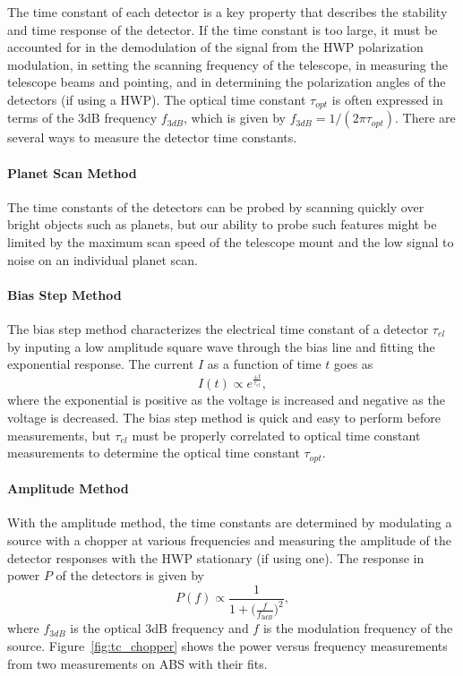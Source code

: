 The time constant of each detector is a key property that describes the stability and time response of the detector. If the time constant is too large, it must be accounted for in the demodulation of the signal from the HWP polarization modulation, in setting the scanning frequency of the telescope, in measuring the telescope beams and pointing, and in determining the polarization angles of the detectors (if using a HWP). The optical time constant $\tau_{opt}$ is often expressed in terms of the 3dB frequency $f_{3 dB}$, which is given by $f_{3dB}=1/(2\pi \tau_{opt})$. There are several ways to measure the detector time constants.

\paragraph{Planet Scan Method} The time constants of the detectors can be probed by scanning quickly over bright objects such as planets, but our ability to probe such features might be limited by the maximum scan speed of the telescope mount and the low signal to noise on an individual planet scan.

\paragraph{Bias Step Method} The bias step method characterizes the electrical time constant of a detector $\tau_{el}$ by inputing a low amplitude square wave through the bias line and fitting the exponential response. The current $I$ as a function of time $t$ goes as
\begin{equation}
I(t) \propto e^{\frac{\pm t}{\tau_{el}}},
\end{equation}
where the exponential is positive as the voltage is increased and negative as the voltage is decreased. The bias step method is quick and easy to perform before measurements, but $\tau_{el}$ must be properly correlated to optical time constant measurements to determine the optical time constant $\tau_{opt}$.

\paragraph{Amplitude Method} With the amplitude method, the time constants are determined by modulating a source with a chopper at various frequencies and measuring the amplitude of the detector responses with the HWP stationary (if using one). The response in power $P$ of the detectors is given by
\begin{equation}\label{eqn:tc_amp}
P(f) \propto \frac{1}{1+\Big(\frac{f}{f_{3dB}}\Big)^2},
\end{equation}
where $f_{3dB}$ is the optical 3dB frequency and $f$ is the modulation frequency of the source. Figure~\ref{fig:tc_chopper} shows the power versus frequency measurements from two measurements on ABS with their fits.

